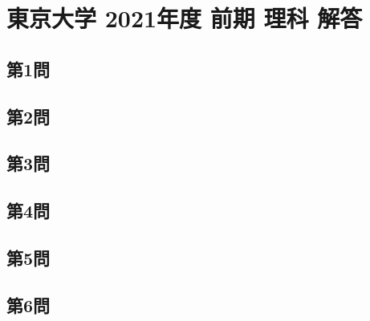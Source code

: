 ﻿\documentclass[../../uem_tok_a.tex]{subfiles}
\begin{document}
    \section{東京大学 2021年度 前期 理科 解答}

    \subsection{第1問}
    

    \clearpage
    \subsection{第2問}
    

    \clearpage
    \subsection{第3問}
    

    \clearpage
    \subsection{第4問}
    

    \clearpage
    \subsection{第5問}
    

    \clearpage
    \subsection{第6問}
    

    \clearpage
\end{document}
